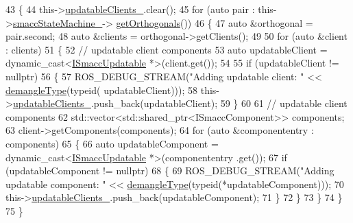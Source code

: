 \begin{DoxyCode}
43     \{
44         this->\hyperlink{classsmacc_1_1SignalDetector_a01a457b4ec935473d6426efb7b87e683}{updatableClients\_}.clear();
45         \textcolor{keywordflow}{for} (\textcolor{keyword}{auto} pair : this->\hyperlink{classsmacc_1_1SignalDetector_a46025de6ac7b5980e22144f9703236a4}{smaccStateMachine\_}->
      \hyperlink{classsmacc_1_1ISmaccStateMachine_a7f5b2882dbd077584767cb2533ed3c49}{getOrthogonals}())
46         \{
47             \textcolor{keyword}{auto} &orthogonal = pair.second;
48             \textcolor{keyword}{auto} &clients = orthogonal->getClients();
49 
50             \textcolor{keywordflow}{for} (\textcolor{keyword}{auto} &client : clients)
51             \{
52                 \textcolor{comment}{// updatable client components}
53                 \textcolor{keyword}{auto} updatableClient = \textcolor{keyword}{dynamic\_cast<}\hyperlink{classISmaccUpdatable}{ISmaccUpdatable} *\textcolor{keyword}{>}(client.get());
54 
55                 \textcolor{keywordflow}{if} (updatableClient != \textcolor{keyword}{nullptr})
56                 \{
57                     ROS\_DEBUG\_STREAM(\textcolor{stringliteral}{"Adding updatable client: "} << \hyperlink{namespacesmacc_1_1introspection_a670e39ccea29952859df4e2d0e45077b}{demangleType}(\textcolor{keyword}{typeid}(
      updatableClient)));
58                     this->\hyperlink{classsmacc_1_1SignalDetector_a01a457b4ec935473d6426efb7b87e683}{updatableClients\_}.push\_back(updatableClient);
59                 \}
60 
61                 \textcolor{comment}{// updatable client components}
62                 std::vector<std::shared\_ptr<ISmaccComponent>> components;
63                 client->getComponents(components);
64                 \textcolor{keywordflow}{for} (\textcolor{keyword}{auto} &componententry : components)
65                 \{
66                     \textcolor{keyword}{auto} updatableComponent = \textcolor{keyword}{dynamic\_cast<}\hyperlink{classISmaccUpdatable}{ISmaccUpdatable} *\textcolor{keyword}{>}(componententry
      .get());
67                     \textcolor{keywordflow}{if} (updatableComponent != \textcolor{keyword}{nullptr})
68                     \{
69                         ROS\_DEBUG\_STREAM(\textcolor{stringliteral}{"Adding updatable component: "} << 
      \hyperlink{namespacesmacc_1_1introspection_a670e39ccea29952859df4e2d0e45077b}{demangleType}(\textcolor{keyword}{typeid}(*updatableComponent)));
70                         this->\hyperlink{classsmacc_1_1SignalDetector_a01a457b4ec935473d6426efb7b87e683}{updatableClients\_}.push\_back(updatableComponent);
71                     \}
72                 \}
73             \}
74         \}
75     \}
\end{DoxyCode}
